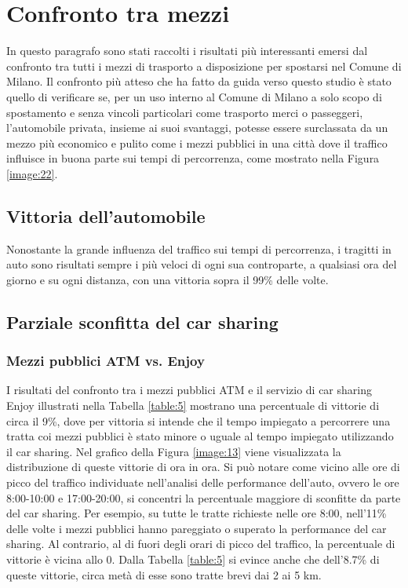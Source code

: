 \section{Confronto tra mezzi}

In questo paragrafo sono stati raccolti i risultati più interessanti emersi dal confronto tra tutti i mezzi di trasporto a disposizione per spostarsi nel Comune di Milano. Il confronto più atteso che ha fatto da guida verso questo studio è stato quello di verificare se, per un uso interno al Comune di Milano a solo scopo di spostamento e senza vincoli particolari come trasporto merci o passeggeri, l'automobile privata, insieme ai suoi svantaggi, potesse essere surclassata da un mezzo più economico e pulito come i mezzi pubblici in una città dove il traffico influisce in buona parte sui tempi di percorrenza, come mostrato nella Figura \ref{image:22}.

\subsection{Vittoria dell'automobile}

Nonostante la grande influenza del traffico sui tempi di percorrenza, i tragitti in auto sono risultati sempre i più veloci di ogni sua controparte, a qualsiasi ora del giorno e su ogni distanza, con una vittoria sopra il 99\% delle volte.

\subsection{Parziale sconfitta del car sharing}

\subsubsection{Mezzi pubblici ATM vs. Enjoy}

I risultati del confronto tra i mezzi pubblici ATM e il servizio di car sharing Enjoy illustrati nella Tabella \ref{table:5} mostrano una percentuale di vittorie di circa il 9\%, dove per vittoria si intende che il tempo impiegato a percorrere una tratta coi mezzi pubblici è stato minore o uguale al tempo impiegato utilizzando il car sharing. Nel grafico della Figura \ref{image:13} viene visualizzata la distribuzione di queste vittorie di ora in ora. Si può notare come vicino alle ore di picco del traffico individuate nell'analisi delle performance dell'auto, ovvero le ore 8:00-10:00 e 17:00-20:00, si concentri la percentuale maggiore di sconfitte da parte del car sharing. Per esempio, su tutte le tratte richieste nelle ore 8:00, nell'11\% delle volte i mezzi pubblici hanno pareggiato o superato la performance del car sharing. Al contrario, al di fuori degli orari di picco del traffico, la percentuale di vittorie è vicina allo 0. Dalla Tabella \ref{table:5} si evince anche che dell'8.7\% di queste vittorie, circa metà di esse sono tratte brevi dai 2 ai 5 km.

